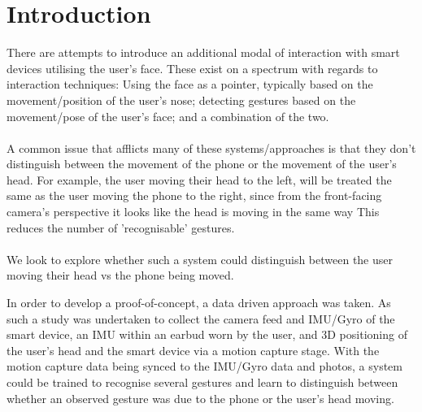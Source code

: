 \section{Introduction} %

There are attempts to introduce an additional modal of interaction with smart devices utilising the user's face.
These exist on a spectrum with regards to interaction techniques: Using the face as a pointer, typically based on the movement/position of the user's nose; detecting gestures based on the movement/pose of the user's face; and a combination of the two.
\\\\
A common issue that afflicts many of these systems/approaches is that they don't distinguish between the movement of the phone or the movement of the user's head. For example, the user moving their head to the left, will be treated the same as the user moving the phone to the right, since from the front-facing camera's perspective it looks like the head is moving in the same way%
This reduces the number of 'recognisable' gestures.
\\\\
We look to explore whether such a system could distinguish between the user moving their head vs the phone being moved. %

In order to develop a proof-of-concept, a data driven approach was taken.
As such a study was undertaken to collect the camera feed and IMU/Gyro of the smart device, an IMU within an earbud worn by the user, and 3D positioning of the user's head and the smart device via a motion capture stage.
With the motion capture data being synced to the IMU/Gyro data and photos, a system could be trained to recognise several gestures and learn to distinguish between whether an observed gesture was due to the phone or the user's head moving.






